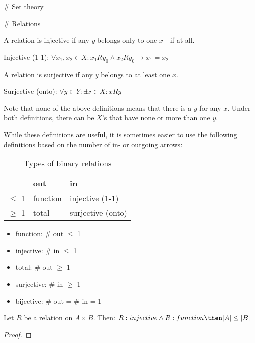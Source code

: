 # Set theory

# Relations

A relation is injective if any $y$ belongs only to one $x$ - if at all.
\begin{definition}
    Injective (1-1): $\forall x_1, x_2 \in X: x_1 R y_0 \land x_2 R y_0 \rightarrow x_1 = x_2$
\end{definition}

A relation is surjective if any $y$ belongs to at least one $x$.
\begin{definition}
    Surjective (onto): $\forall y \in Y: \exists x \in X: x R y$
\end{definition}

Note that none of the above definitions means that there is a $y$ for any $x$. Under both definitions, there can be $X$'s that have none or more than one $y$. 

While these definitions are useful, it is sometimes easier to use the following definitions based on the number of in- or outgoing arrows:

\begin{table}[h]
\centering
\caption{Types of binary relations}
\begin{tabular}{@{}lll@{}}
\toprule
               & out      & in         \\ \midrule
$\leq$ 1       & function & injective (1-1) \\
$\geq$ 1       & total    & surjective (onto) \\ \bottomrule
\end{tabular}
\end{table}

\begin{itemize}
    \item function: \# out $\leq$ 1
    \item injective: \# in $\leq$ 1
    \item total: \# out $\geq$ 1
    \item surjective: \# in $\geq$ 1
    \item bijective: \# out = \# in = 1
\end{itemize}

\begin{theorem}
 Let $R$ be a relation on $ A \times B$. Then: 
 $ R:injective \land R:function \then  |A| \leq |B|$
\end{theorem}
\begin{proof}
\end{proof}

